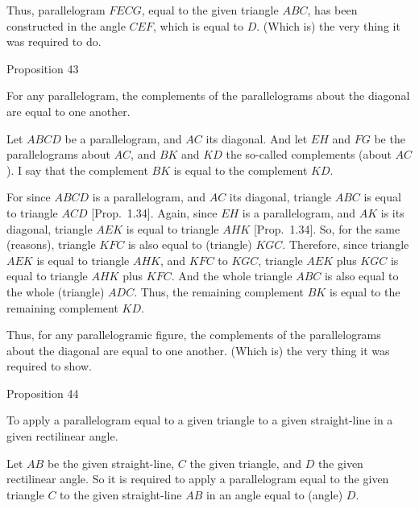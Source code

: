 Thus, parallelogram $FECG$,  equal to the given
triangle $ABC$, has been constructed in the angle $CEF$, which is equal to $D$. (Which is) the
very thing it was required to do.


\begin{center}
{\large Proposition 43}
\end{center}

For any parallelogram, the complements of the parallelograms about the diagonal are equal to one another.

Let $ABCD$ be a parallelogram, and $AC$ its diagonal. And let $EH$ and $FG$
be the parallelograms about  $AC$, and $BK$ and $KD$ the so-called complements
(about $AC$).
I say that the complement $BK$ is equal to the complement $KD$.

For since $ABCD$ is a parallelogram, and $AC$ its diagonal,  triangle
$ABC$ is equal to triangle $ACD$ [Prop.~1.34]. Again, since $EH$ is
a parallelogram, and $AK$ is its diagonal, triangle $AEK$ is equal to
triangle $AHK$ [Prop.~1.34]. So, for the same (reasons), triangle
$KFC$ is also equal to (triangle) $KGC$. Therefore, since triangle $AEK$ is
equal to triangle $AHK$, and $KFC$ to $KGC$, triangle $AEK$ plus $KGC$ is
equal to triangle $AHK$ plus $KFC$. And the whole triangle $ABC$ is
also equal to the whole (triangle) $ADC$. Thus, the remaining complement
$BK$ is equal to the remaining complement $KD$.

\epsfysize=1.7in
\centerline{}

Thus, for any parallelogramic figure, the complements of the
parallelograms about the diagonal are equal to one another.
(Which is) the very thing it was required to show.


\begin{center}
{\large Proposition 44}
\end{center}

To apply a parallelogram equal to a given triangle to a given straight-line
in a given rectilinear angle.\\

\epsfysize=2.7in
\centerline{}

Let $AB$ be the given straight-line,  $C$ the given triangle, and $D$ the
given rectilinear angle. So it is required to apply a parallelogram
equal to the given triangle $C$ to the given straight-line $AB$ in an angle equal to (angle) $D$.

